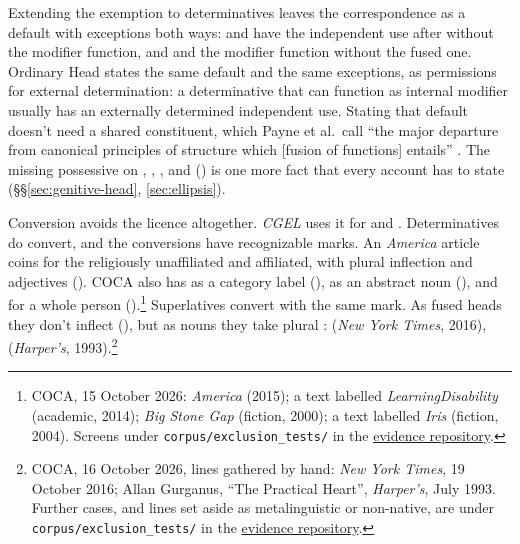 \documentclass[12pt]{article}
\begin{document}
Extending the exemption to determinatives leaves the correspondence as a default with exceptions both ways:  and  have the independent use after  without the modifier function, and  and  the modifier function without the fused one. Ordinary Head states the same default and the same exceptions, as permissions for external determination: a determinative that can function as internal modifier usually has an externally determined independent use. Stating that default doesn't need a shared constituent, which Payne et al.\ call \enquote{the major departure from canonical principles of structure which [fusion of functions] entails} \citep[570--571]{Payne2007}. The missing possessive on , , , and  () is one more fact that every account has to state (§§\ref{sec:genitive-head}, \ref{sec:ellipsis}).

Conversion avoids the licence altogether. \textit{CGEL} uses it for  and  \citep[423 n.~43]{huddleston2002}. Determinatives do convert, and the conversions have recognizable marks. An \textit{America} article coins  for the religiously unaffiliated and affiliated, with plural inflection and adjectives (). COCA also has  as a category label (),  as an abstract noun (), and  for a whole person ().\footnote{COCA, 15 October 2026: \textit{America} (2015); a text labelled \textit{LearningDisability} (academic, 2014); \textit{Big Stone Gap} (fiction, 2000); a text labelled \textit{Iris} (fiction, 2004). Screens under \texttt{corpus/exclusion\_tests/} in the \href{https://github.com/BrettRey/determinatives-as-nouns}{evidence repository}.} Superlatives convert with the same mark. As fused heads they don't inflect (), but as nouns they take plural :  (\textit{New York Times}, 2016),  (\textit{Harper's}, 1993).\footnote{COCA, 16 October 2026, lines gathered by hand: \textit{New York Times}, 19 October 2016; Allan Gurganus, \enquote{The Practical Heart}, \textit{Harper's}, July 1993. Further cases, and lines set aside as metalinguistic or non-native, are under \texttt{corpus/exclusion\_tests/} in the \href{https://github.com/BrettRey/determinatives-as-nouns}{evidence repository}.}
\end{document}
